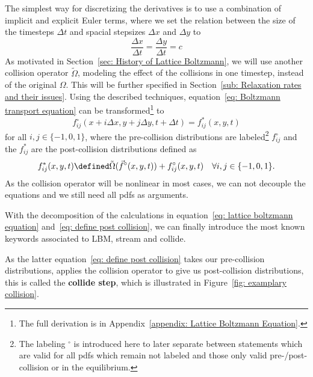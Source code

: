 The simplest way for discretizing the derivatives is to use a combination of implicit and explicit Euler terms, where we set the relation between the size of the timesteps $\Delta t$ and spacial stepsizes $\Delta x$ and $\Delta y$ to
\begin{equation}
  \label{eq: relation between stepsizes}
  \frac{\Delta x} {\Delta{t}} = \frac{\Delta y} {\Delta{t}} = c
\end{equation}
As motivated in Section~\ref{sec: History of Lattice Boltzmann}, we will use another collision operator $\tilde{\Omega}$, modeling the effect of the collisions in one timestep, instead of the original $\Omega$.
This will be further specified in Section~\ref{sub: Relaxation rates and their issues}.
Using the described techniques, equation~\eqref{eq: Boltzmann transport equation} can be transformed\footnote{The full derivation is in Appendix~\ref{appendix: Lattice Boltzmann Equation}.} to
\begin{equation}
  \label{eq: lattice boltzmann equation}
    f_{ij}^\circ(x + i \Delta x , y + j \Delta y,t + \Delta t)
    = f_{ij}^*(x, y, t)
\end{equation}
for all $i,j\in \{-1, 0, 1\}$, where the  pre-collision distributions are labeled\footnote{The labeling $^\circ$ is introduced here to later separate between statements which are valid for all \glspl{pdf} which remain not labeled and those only valid pre-/post-collision or in the equilibrium.} $f_{ij}^\circ$ and the $f_{ij}^*$ are the post-collision distributions defined as
\begin{equation}
  \label{eq: define post collision}
  f_{ij}^*(x, y, t) \defined \tilde{\Omega}(\vec{f}^\circ(x,y,t)) + f_{ij}^\circ(x,y,t) \quad\forall i,j\in \{-1, 0, 1\}.
\end{equation}
As the collision operator will be nonlinear in most cases, we can not decouple the equations and we still need all \glspl{pdf} as arguments.

With the decomposition of the calculations in equation~\eqref{eq: lattice boltzmann equation} and~\eqref{eq: define post collision}, we can finally introduce the most known keywords associated to LBM, stream and collide.

As the latter equation~\eqref{eq: define post collision} takes our pre-collision distributions, applies the collision operator to give us post-collision distributions, this is called the \textbf{collide step}, which is illustrated in Figure~\ref{fig: examplary collision}.

